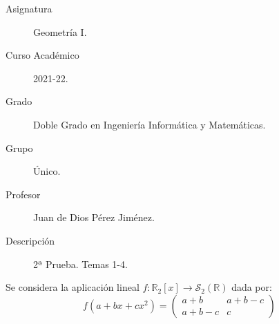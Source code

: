 \documentclass[12pt]{article}
\begin{document}

    
    

    \begin{description}
        \item[Asignatura] Geometría I.
        \item[Curso Académico] 2021-22.
        \item[Grado] Doble Grado en Ingeniería Informática y Matemáticas.
        \item[Grupo] Único.
        \item[Profesor] Juan de Dios Pérez Jiménez.
        \item[Descripción] 2ª Prueba. Temas 1-4.
    
    \end{description}
    \newpage
    

    Se considera la aplicación lineal $\displaystyle f:\mathbb{R}_2[x] \longrightarrow \mathcal{S}_2(\mathbb{R})$ dada por:
    \begin{equation*}
        f(a+bx+cx^2) = \left( \begin{array}{cc}
            a+b & a+b-c \\
            a+b-c & c
        \end{array}\right)
    \end{equation*}
\end{document}

